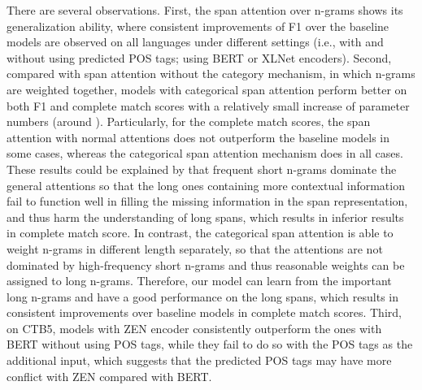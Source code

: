 \documentclass[11pt,a4paper]{article}
\begin{document}
There are several observations.
First, the span attention over n-grams shows its generalization ability, where 
consistent improvements of F1 over the baseline models are observed on all languages under different settings (i.e., with and without using predicted POS tags; using BERT or XLNet encoders).
Second, compared with span attention without the category mechanism, in which n-grams are weighted together, 
models with categorical span attention perform better on both F1 and complete match scores with a relatively small increase of parameter numbers (around ).
Particularly, for the complete match scores, the span attention with normal attentions does not outperform the baseline models in some cases, whereas the categorical span attention mechanism does in all cases.
These results could be explained by that frequent short n-grams dominate the general attentions so that the long ones containing more contextual information fail to function well in filling the missing information in the span representation, and thus harm the understanding of long spans, which results in inferior results in complete match score.
In contrast, the categorical span attention is able to weight n-grams in different length separately, so that the attentions are not dominated by high-frequency short n-grams and thus reasonable weights can be assigned to long n-grams.
Therefore, our model can learn from the important long n-grams and have a good performance on the long spans, which results in consistent improvements over baseline models in complete match scores.
Third, on CTB5,
models with ZEN encoder consistently outperform the ones with BERT without using POS tags, while they fail to do so with the POS tags as the additional input, which suggests that the predicted POS tags may have more conflict with ZEN compared with BERT.
\end{document}
